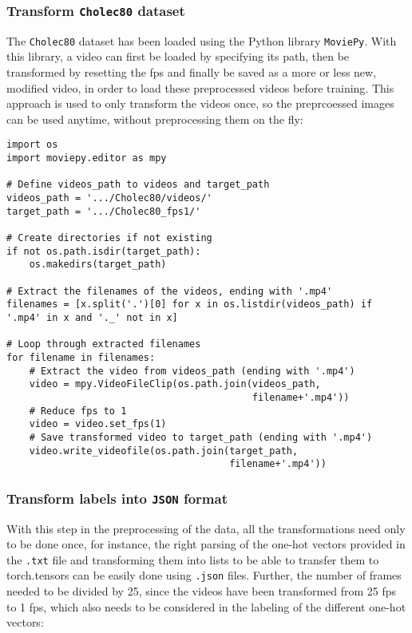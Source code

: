 \documentclass{article}
\begin{document}
\subsubsection{Transform \texttt{Cholec80} dataset}
The \texttt{Cholec80} dataset has been loaded using the Python library \texttt{MoviePy}. With this library, a video can first be loaded by specifying its path, then be transformed by resetting the fps and finally be saved as a more or less new, modified video, in order to load these preprocessed videos before training. This approach is used to only transform the videos once, so the preprcoessed images can be used anytime, without preprocessing them on the fly:

\begin{verbatim}
import os
import moviepy.editor as mpy

# Define videos_path to videos and target_path
videos_path = '.../Cholec80/videos/'
target_path = '.../Cholec80_fps1/'

# Create directories if not existing
if not os.path.isdir(target_path):
    os.makedirs(target_path)
        
# Extract the filenames of the videos, ending with '.mp4'
filenames = [x.split('.')[0] for x in os.listdir(videos_path) if
'.mp4' in x and '._' not in x]

# Loop through extracted filenames
for filename in filenames:
    # Extract the video from videos_path (ending with '.mp4')
    video = mpy.VideoFileClip(os.path.join(videos_path,
                                           filename+'.mp4'))
    # Reduce fps to 1
    video = video.set_fps(1)
    # Save transformed video to target_path (ending with '.mp4')
    video.write_videofile(os.path.join(target_path,
                                       filename+'.mp4'))
\end{verbatim}

\subsubsection{Transform labels into \texttt{JSON} format}
With this step in the preprocessing of the data, all the transformations need only to be done once, for instance, the right parsing of the one-hot vectors provided in the \texttt{.txt} file and transforming them into lists to be able to transfer them to torch.tensors can be easily done using \texttt{.json} files. Further, the number of frames needed to be divided by 25, since the videos have been transformed from 25 fps to 1 fps, which also needs to be considered in the labeling of the different one-hot vectors:
\end{document}
